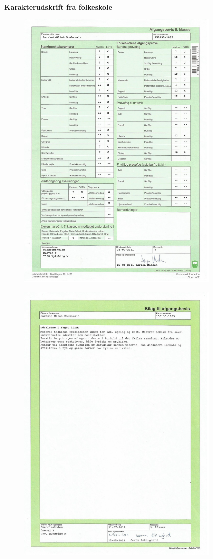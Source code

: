 \documentclass[../Ansoegning.tex]{subfiles}
\begin{document}
\begin{center}
    \Large{\textbf{Karakterudskrift fra folkeskole}}\vspace{-0.7cm}
\end{center}

\begin{figure}[H]
	\centering
	\includegraphics[width=0.87\textwidth]{Eksterne_filer/FSkar1.jpg}
\end{figure}

\begin{figure}[H]
	\centering
	\includegraphics[width=0.87\textwidth]{Eksterne_filer/FSkar2.jpg}
\end{figure}
\end{document}
